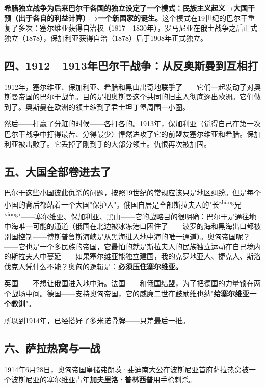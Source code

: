 \documentclass[a4paper,12pt]{ctexart}
\newcommand{\ruby}[2]{#1\textsuperscript{#2}}
\begin{document}
\textbf{希腊独立战争为后来巴尔干各国的独立设定了一个模式：民族主义起义→大国干预（出于各自的利益计算）→一个新国家的诞生。}这个模式在19世纪的巴尔干重复了多次：塞尔维亚获得自治权（1817—1830年），罗马尼亚在俄土战争之后正式独立（1878），保加利亚获得自治（1878）后于1908年正式独立。

\subsection*{四、1912—1913年巴尔干战争：从反奥斯曼到互相打}

1912年，塞尔维亚、保加利亚、希腊和黑山出奇地\textbf{联手了}——它们一起发动了对奥斯曼帝国的巴尔干战争。目的是把奥斯曼\-\-这个共同的旧主人\-\-彻底逐出欧洲。它们做到了。奥斯曼在欧洲的领土缩到了君士坦丁堡周围一小圈。

然后——打赢了分赃的时候——各打各的。1913年，保加利亚（觉得自己在第一次巴尔干战争中打得最苦、分得最少）悍然进攻了它的前盟友塞尔维亚和希腊。保加利亚被击败了。它丢掉了刚到手的大部分领土。仇恨再次被加固。

\subsection*{五、大国全部卷进去了}

巴尔干这些小国彼此仇杀的问题，按照19世纪的常规应该只是地区纠纷。但是每个小国的背后都站着一个大国"保护人"。俄国自居是全部斯拉夫人的"\ruby{长}{zhǎng}\ruby{兄}{xiōng}"——塞尔维亚、保加利亚、黑山——它的战略目的很明确：巴尔干是通往地中海唯一可能的通道（俄国在北边被冰冻港口困住了——波罗的海和黑海出口都被别国控制——博斯普鲁斯海峡是从黑海进入地中海的唯一通道）。奥匈帝国呢？——它也是一个多民族的帝国，它最怕的就是斯拉夫人的民族独立运动在自己境内的斯拉夫人中蔓延——如果塞尔维亚能独立建国，我的克罗地亚人、捷克人、斯洛伐克人凭什么不能？奥匈的逻辑是：\textbf{必须压住塞尔维亚。}

英国——不想让俄国进入地中海。法国——和俄国结盟，为了把德国的力量锁在两个战场中间。德国——支持奥匈帝国，它的威廉二世在鼓励维也纳"\textbf{给塞尔维亚一个教训}"。

所以到1914年，已经搭好了多米诺骨牌——只差最后一推。

\subsection*{六、萨拉热窝与一战}

1914年6月28日，奥匈帝国皇储弗朗茨·斐迪南大公在波斯尼亚首府萨拉热窝被一个波斯尼亚的塞尔维亚青年\textbf{加夫里洛·普林西普}用手枪刺杀。
\end{document}
